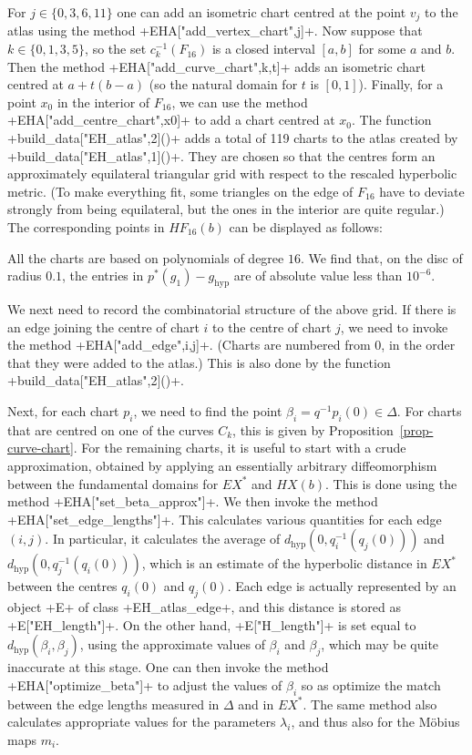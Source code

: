\documentclass[reqno]{amsart}
\newcommand{\hyp}	{\operatorname{hyp}}
\newcommand{\Dl}        {\Delta}
\newcommand{\bt}        {\beta}
\newcommand{\lm}        {\lambda}
\renewcommand{\:}{\colon}
\theoremstyle{definition}
\begin{document}
For $j\in\{0,3,6,11\}$ one can add an isometric chart centred at the
point $v_j$ to the atlas using the method
\mcode+EHA["add_vertex_chart",j]+.  Now suppose that
$k\in\{0,1,3,5\}$, so the set $c_k^{-1}(F_{16})$ is a closed interval
$[a,b]$ for some $a$ and $b$.  Then the method
\mcode+EHA["add_curve_chart",k,t]+ adds an isometric chart centred at
$a+t(b-a)$ (so the natural domain for $t$ is $[0,1]$).  Finally, for a
point $x_0$ in the interior of $F_{16}$, we can use the method
\mcode+EHA["add_centre_chart",x0]+ to add a chart centred at $x_0$.
The function \mcode+build_data["EH_atlas",2]()+ adds a total of 119
charts to the atlas created by \mcode+build_data["EH_atlas",1]()+.
They are chosen so that the centres form an approximately equilateral
triangular grid with respect to the rescaled hyperbolic metric.  (To
make everything fit, some triangles on the edge of $F_{16}$ have to
deviate strongly from being equilateral, but the ones in the interior
are quite regular.)  The corresponding points in $HF_{16}(b)$ can be
displayed as follows: 
 
All the charts are based on polynomials of degree $16$.  We find that,
on the disc of radius $0.1$, the entries in $p^*(g_1)-g_{\hyp}$ are of
absolute value less than $10^{-6}$.

We next need to record the combinatorial structure of the above grid.
If there is an edge joining the centre of chart $i$ to the centre of
chart $j$, we need to invoke the method \mcode+EHA["add_edge",i,j]+.
(Charts are numbered from $0$, in the order that they were added to
the atlas.)  This is also done by the function
\mcode+build_data["EH_atlas",2]()+.

Next, for each chart $p_i$, we need to find the point
$\bt_i=q^{-1}p_i(0)\in\Dl$.  For charts that are centred on one of the
curves $C_k$, this is given by Proposition~\ref{prop-curve-chart}.
For the remaining charts, it is useful to start with a crude
approximation, obtained by applying an essentially arbitrary
diffeomorphism between the fundamental domains for $EX^*$ and
$HX(b)$.  This is done using the method
\mcode+EHA["set_beta_approx"]+.  We then invoke the method
\mcode+EHA["set_edge_lengths"]+.  This calculates various quantities
for each edge $(i,j)$.  In particular, it calculates the average of
$d_{\hyp}(0,q_i^{-1}(q_j(0)))$ and $d_{\hyp}(0,q_j^{-1}(q_i(0)))$,
which is an estimate of the hyperbolic distance in $EX^*$ between the
centres $q_i(0)$ and $q_j(0)$.  Each edge is actually represented by
an object \mcode+E+ of class \mcode+EH_atlas_edge+, and this distance
is stored as \mcode+E["EH_length"]+.  On the other hand,
\mcode+E["H_length"]+ is set equal to $d_{\hyp}(\bt_i,\bt_j)$, using the
approximate values of $\bt_i$ and $\bt_j$, which may be quite
inaccurate at this stage.  One can then invoke the method
\mcode+EHA["optimize_beta"]+ to adjust the values of $\bt_i$ so as
optimize the match between the edge lengths measured in $\Dl$ and in
$EX^*$.  The same method also calculates appropriate values for the
parameters $\lm_i$, and thus also for the M\"obius maps $m_i$.
\end{document}
